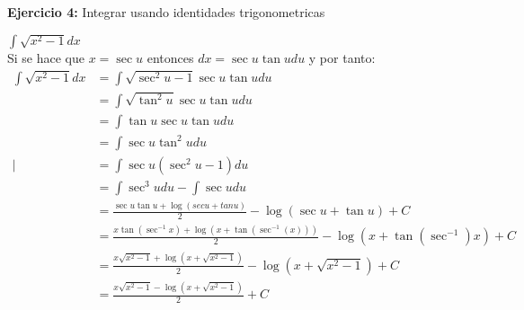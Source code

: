 \documentclass[../main.tex]{subfiles}
\begin{document}
    \question \textbf{Ejercicio 4:} Integrar usando identidades trigonometricas
    \begin{partes}
        \parte $\int \sqrt{x^2-1} dx$\\
        Si se hace que $x = \sec u$ entonces $dx = \sec u \tan u du$ y por tanto:
        \begin{align*}
            \int \sqrt{x^2-1} dx &= \int \sqrt{\sec^2 u -1} \sec u \tan u du\\
            &= \int \sqrt{\tan^2 u} \sec u \tan u du\\
            &= \int \tan u \sec u \tan u du\\
            &= \int \sec u \tan^2 u du\\|
            &= \int \sec u(\sec^2 u - 1) du\\
            &= \int \sec^3 u du - \int \sec u du\\
            &= \frac{\sec u \tan u + \log(sec u + tan u)}{2} - \log(\sec u + \tan u) + C\\
            &= \frac{x \tan(\sec^{-1} x) + \log(x + \tan(\sec^{-1}(x)))}{2} - \log(x + \tan(\sec^{-1}) x) + C\\
            &= \frac{x \sqrt{x^2-1} + \log(x + \sqrt{x^2-1})}{2} - \log(x + \sqrt{x^2-1}) + C\\
            &= \frac{x \sqrt{x^2-1} - \log(x + \sqrt{x^2-1})}{2}+ C
        \end{align*}
    \end{partes}
\end{document}
